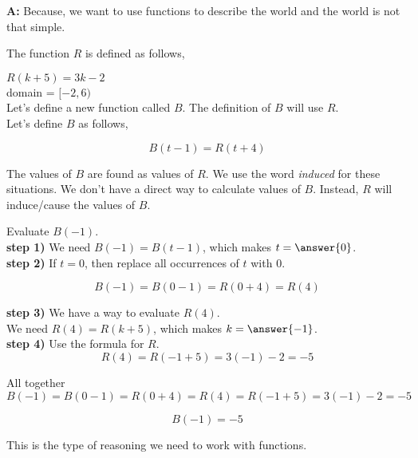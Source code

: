 \documentclass{ximera}
\begin{document}
\textbf{A:} Because, we want to use functions to describe the world and the world is not that simple. \\




\begin{example}


The function $R$ is defined as follows,

$R(k + 5) = 3k - 2$ \\
domain = $[-2, 6)$ \\


Let's define a new function called $B$.  The definition of $B$ will use $R$. \\



Let's define $B$ as follows,

\[ 
B(t - 1) = R(t + 4)
\]

The values of $B$ are found as values of $R$.  We use the word \textit{induced} for these situations.  We don't have a direct way to calculate values of $B$.  Instead, $R$ will induce/cause the values of $B$. \\


\begin{question}

Evaluate $B(-1)$. \\


\textbf{step 1)}  We need $B(-1) = B(t - 1)$, which makes $t = \answer{0}$. \\


\textbf{step 2)}  If $t = 0$, then replace all occurrences of $t$ with $0$. 

\[
B(-1) = B(0 - 1) = R(0 + 4) = R(4)
\]


\textbf{step 3)} We have a way to evaluate $R(4)$.\\


We need $R(4) = R(k + 5)$, which makes $k = \answer{-1}$. \\


\textbf{step 4)} Use the formula for $R$.\\

\[
R(4) = R(-1 + 5) = 3(-1) - 2 = -5
\]


All together \\



\[
B(-1) = B(0 - 1) = R(0 + 4) = R(4) = R(-1 + 5) = 3(-1) - 2 = -5
\]


\[
B(-1) = -5
\]

\end{question}


This is the type of reasoning we need to work with functions. \\












\end{example}
\end{document}
